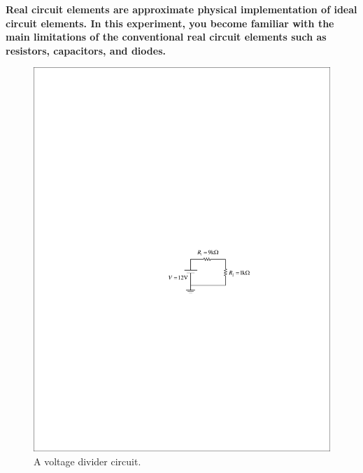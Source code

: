 \documentclass[11pt]{article}
\begin{document}
\textbf{Real circuit elements are approximate physical implementation of ideal circuit elements. In this experiment, you become familiar with the main limitations of the conventional real circuit elements such as resistors, capacitors, and diodes.
}



\begin{question}


\begin{figure}[H]
\centering
\includegraphics[scale=1.2,angle=0]{Fig/cir1.pdf}
\caption{A voltage divider circuit.} \label{fig:cir1}
\end{figure}


\end{question}
\end{document}
